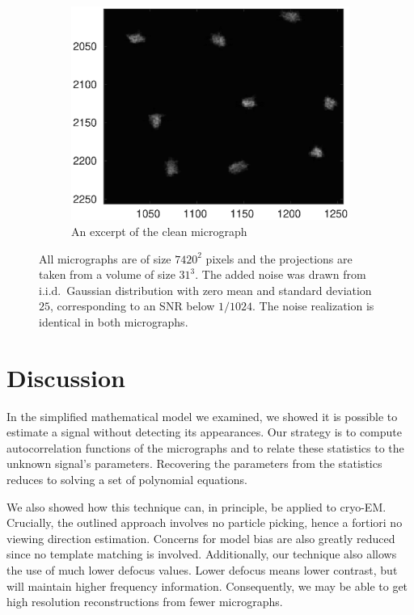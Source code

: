 \documentclass[9pt,twocolumn,twoside,lineno]{pnas-new}
\begin{document}
\begin{figure}[h]
	\begin{subfigure}[h]{0.3\textwidth}
		\centering
		\includegraphics[scale=0.4]{clean_micrograph_cutout.eps}
		\caption{An excerpt of the clean micrograph}
	\end{subfigure}
	\caption{\label{fig:cryo_detection} All micrographs are of size $7420^2$ pixels and the projections are taken from a volume of size $31^3$. The added noise was drawn from i.i.d.\ Gaussian distribution with zero mean and standard deviation $25$, corresponding to an SNR below $1/1024$.  
		The noise realization is identical in both micrographs. }	
\end{figure}



\section{Discussion}

In the simplified mathematical model we examined, we showed it is possible to estimate a signal without detecting its appearances.  
Our strategy is to compute autocorrelation functions of the micrographs and to relate these statistics to the unknown signal's parameters. Recovering the parameters from the statistics reduces to solving a set of polynomial equations. 

We also showed how this technique can, in principle, be applied to cryo-EM.
Crucially, the outlined approach involves no particle picking, hence a fortiori no viewing direction estimation. Concerns for model bias are also greatly reduced since no template matching is involved.
Additionally,  our technique also allows the use of much lower defocus values. Lower defocus means lower contrast, but will maintain  higher frequency information. Consequently, we may be able to get high resolution reconstructions from fewer micrographs.
\end{document}
